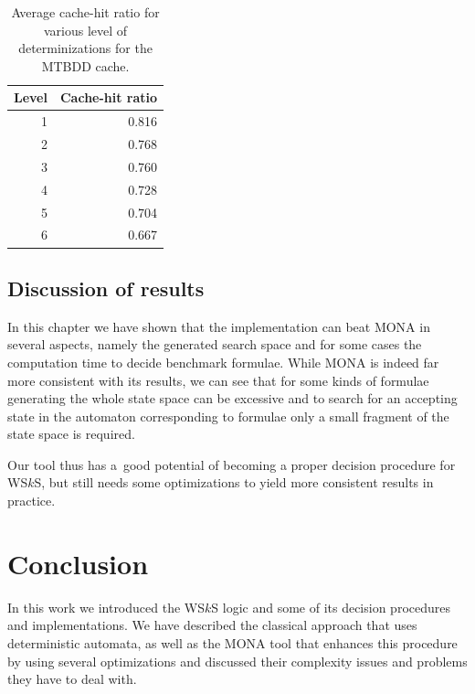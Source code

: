 \begin{table}[h!]
 \begin{center}
  \begin{tabular}{| r | r |}
  \hline
   \textbf{Level} & \textbf{Cache-hit ratio}\\
   \hline
   \hline
   1 & 0.816\\
   \hline
   2 & 0.768\\
   \hline
   3 & 0.760\\
   \hline
   4 & 0.728\\
   \hline
   5 & 0.704\\
   \hline
   6 & 0.667\\
   \hline
  \end{tabular}
 \end{center}
 \caption{Average cache-hit ratio for various level of determinizations for
 the MTBDD cache.}\label{cache-hits}
\end{table}

\section{Discussion of results}

In this chapter we have shown that the implementation can beat
\textsc{MONA} in several aspects, namely the generated search space and for some
cases the computation time to decide benchmark formulae. While \textsc{MONA} is
indeed far more consistent with its results, we can see that for some kinds of
formulae generating the whole state space can be excessive and to search for an
accepting state in the automaton corresponding to formulae only a small fragment
of the state space is required. 

Our tool thus has a~good potential of becoming a proper decision procedure for
WS$k$S, but still needs some optimizations to yield more consistent results in practice. 

\chapter{Conclusion}\label{summary}

In this work we introduced the WS$k$S logic and some of its decision procedures
and implementations.
We have described the classical approach that uses deterministic automata, as well
as the \textsc{MONA} tool that enhances this procedure by using several
optimizations and discussed their complexity issues and problems they have to deal with.

